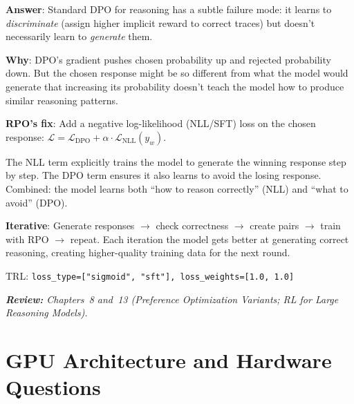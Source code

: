 \begin{questionbox}
\textbf{Answer}: Standard DPO for reasoning has a subtle failure mode: it learns to \emph{discriminate} (assign higher implicit reward to correct traces) but doesn’t necessarily learn to \emph{generate} them.

\textbf{Why}: DPO’s gradient pushes chosen probability up and rejected probability down. But the chosen response might be so different from what the model would generate that increasing its probability doesn’t teach the model how to produce similar reasoning patterns.

\textbf{RPO’s fix}: Add a negative log-likelihood (NLL/SFT) loss on the chosen response: $\mathcal{L} = \mathcal{L}_\text{DPO} + \alpha \cdot \mathcal{L}_\text{NLL}(y_w)$.

The NLL term explicitly trains the model to generate the winning response step by step. The DPO term ensures it also learns to avoid the losing response. Combined: the model learns both ``how to reason correctly'' (NLL) and ``what to avoid'' (DPO).

\textbf{Iterative}: Generate responses $\rightarrow$ check correctness $\rightarrow$ create pairs $\rightarrow$ train with RPO $\rightarrow$ repeat. Each iteration the model gets better at generating correct reasoning, creating higher-quality training data for the next round.

TRL: \texttt{loss\_type=["sigmoid", "sft"], loss\_weights=[1.0, 1.0]}

\emph{\textbf{Review:} Chapters~8 and~13 (Preference Optimization Variants; RL for Large Reasoning Models).}
\end{questionbox}

\section{GPU Architecture and Hardware Questions}
\label{gpu-architecture-and-hardware-questions}

